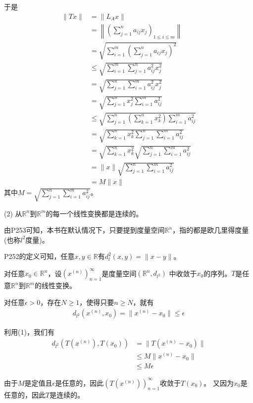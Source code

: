 \documentclass{article}
\begin{document}
于是
\begin{align*}
  \|Tx\| & = \|L_A x\|                                                                                             \\
         & = \left\| \left( \sum\limits_{j = 1}^n a_{ij} x_j \right)_{1 \leq i \leq m} \right\|                    \\
         & = \sqrt{\sum\limits_{i=1}^m \left( \sum\limits_{j = 1}^n a_{ij} x_j \right)^2}                          \\
         & \leq \sqrt{\sum\limits_{i=1}^m \sum\limits_{j = 1}^n a_{ij}^2 x_j^2}                                    \\
         & = \sqrt{\sum\limits_{j = 1}^n \sum\limits_{i=1}^m a_{ij}^2 x_j^2}                                       \\
         & = \sqrt{\sum\limits_{j = 1}^n x_j^2 \sum\limits_{i=1}^m a_{ij}^2}                                       \\
         & \leq \sqrt{\sum\limits_{j = 1}^n \left(\sum\limits_{k = 1}^n x_k^2\right) \sum\limits_{i=1}^m a_{ij}^2} \\
         & = \sqrt{\sum\limits_{k = 1}^n x_k^2 \sum\limits_{j = 1}^n \sum\limits_{i=1}^m a_{ij}^2}                 \\
         & = \sqrt{\sum\limits_{k = 1}^n x_k^2} \sqrt{ \sum\limits_{j = 1}^n \sum\limits_{i=1}^m a_{ij}^2}         \\
         & = \|x\| \sqrt{\sum\limits_{j = 1}^n \sum\limits_{i=1}^m a_{ij}^2}                                       \\
         & = M \|x\|
\end{align*}
其中$M = \sqrt{\sum\limits_{j = 1}^n \sum\limits_{i=1}^m a_{ij}^2}$。

(2) 从$\mathbb{R}^n$到$\mathbb{R}^m$的每一个线性变换都是连续的。

由P253可知，本书在默认情况下，只要提到度量空间$\mathbb{R}^n$，指的都是欧几里得度量(也称$l^2$度量)。

P252的定义可知，任意$x, y \in \mathbb{R}$有$d_l^2(x, y) = \|x - y\|$。

对任意$x_0 \in \mathbb{R}^n$，设$(x^{(n)})_{n = 1}^\infty$是度量空间$(\mathbb{R}^n, d_{l^2})$
中收敛于$x_0$的序列。$T$是任意$\mathbb{R}^n$到$\mathbb{R}^m$的线性变换。

对任意$\epsilon > 0$，存在$N \geq 1$，使得只要$n \geq N$，就有
\begin{align*}
  d_{l^2} (x^{(n)}, x_0) = \|x^{(n)} - x_0\| \leq \epsilon
\end{align*}

利用(1)，我们有
\begin{align*}
  d_{l^2} (T(x^{(n)}), T(x_0))
   & = \|T(x^{(n)} - x_0)\|   \\
   & \leq M \|x^{(n)} - x_0\| \\
   & \leq M \epsilon
\end{align*}

由于$M$是定值且$\epsilon$是任意的，因此$(T(x^{(n)}))_{n = 1}^\infty$收敛于$T(x_0)$。
又因为$x_0$是任意的，因此$T$是连续的。
\end{document}
